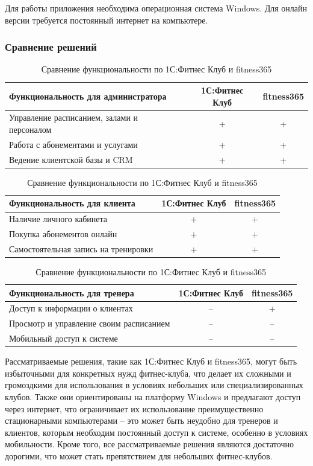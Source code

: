 Для работы приложения необходима операционная система Windows. Для онлайн версии требуется постоянный интернет на компьютере.

\subsubsection*{Сравнение решений}

\begin{table}[ht]
	\centering
	\begin{tabular}{|p{9cm}|c|c|}
		\hline
		\textbf{Функциональность для администратора} & \textbf{1С:Фитнес Клуб} & \textbf{fitness365} \\ \hline
		Управление расписанием, залами и персоналом & + & + \\ \hline
		Работа с абонементами и услугами & + & + \\ \hline
		Ведение клиентской базы и CRM & + & + \\ \hline
	\end{tabular}
	\begin{tabular}{|p{9cm}|c|c|}
		\hline
		\textbf{Функциональность для клиента} & \textbf{1С:Фитнес Клуб} & \textbf{fitness365} \\ \hline
		Наличие личного кабинета & + & + \\ \hline
		Покупка абонементов онлайн & + & + \\ \hline
		Самостоятельная запись на тренировки & + & + \\ \hline
	\end{tabular}
	\begin{tabular}{|p{9cm}|c|c|}
		\hline
		\textbf{Функциональность для тренера} & \textbf{1С:Фитнес Клуб} & \textbf{fitness365} \\ \hline
		Доступ к информации о клиентах & -- & + \\ \hline
		Просмотр и управление своим расписанием & -- & -- \\ \hline
		Мобильный доступ к системе & -- & -- \\ \hline
	\end{tabular}
	\caption{Сравнение функциональности по 1С:Фитнес Клуб и fitness365}
\end{table}

Рассматриваемые решения, такие как 1С:Фитнес Клуб и fitness365, могут быть избыточными для конкретных нужд фитнес-клуба, что делает их сложными и громоздкими для использования в условиях небольших или специализированных клубов. Также они ориентированы на платформу Windows и предлагают доступ через интернет, что ограничивает их использование преимущественно стационарными компьютерами -- это может быть неудобно для тренеров и клиентов, которым необходим постоянный доступ к системе, особенно в условиях мобильности. Кроме того, все рассматриваемые решения являются достаточно дорогими, что может стать препятствием для небольших фитнес-клубов. 

